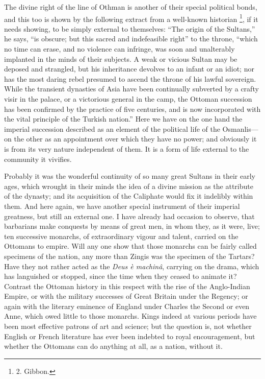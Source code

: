 The divine right of the line
of Othman is another of their special political bonds, and this too is
shown by the following extract from a well-known historian \footnote{2.
Gibbon.}, if it needs showing, to be simply external to themselves: ``The
origin of the Sultans,'' he says, ``is obscure; but this sacred and
indefeasible right'' to the throne, ``which no time can erase, and no
violence can infringe, was soon and unalterably implanted in the minds
of their subjects. A weak or vicious Sultan may be deposed and
strangled, but his inheritance devolves to an infant or an idiot; nor
has the most daring rebel presumed to ascend the throne of his lawful
sovereign. While the transient dynasties of Asia have been continually
subverted by a crafty visir in the palace, or a victorious general in
the camp, the Ottoman succession has been confirmed by the practice of
five centuries, and is now incorporated with the vital principle of
the Turkish nation.'' Here we have on the one hand the imperial
succession described as an element of the political life of the
Osmanlis—on the other as an appointment over which they have no
power; and obviously it is from its very nature independent of them.
It is a form of life external to the community it vivifies.

Probably it was the wonderful
continuity of so many great Sultans in their early ages, which wrought
in their minds the idea of a divine mission as the attribute of the
dynasty; and its acquisition of the Caliphate would fix it indelibly
within them. And here again, we have another special instrument of
their imperial greatness, but still an external one. I have already
had occasion to observe, that barbarians make conquests by means of
great men, in whom they, as it were, live; ten successive monarchs, of
extraordinary vigour and talent, carried on the Ottomans to empire.
Will any one show that those monarchs can be fairly called specimens
of the nation, any more than Zingis was the specimen of the Tartars?
Have they not rather acted as the \emph{Deus è machinâ}, carrying on
the drama, which has languished or stopped, since the time when they
ceased to animate it? Contrast the Ottoman history in this respect
with the rise of the Anglo-Indian Empire, or with the military
successes of Great Britain under the Regency; or again with the
literary eminence of England under Charles the Second or even Anne,
which owed little to those monarchs. Kings indeed at various periods
have been most effective patrons of art and science; but the question
is, not whether English or French literature has ever been indebted to
royal encouragement, but whether the Ottomans can do anything at all,
as a nation, without it.

